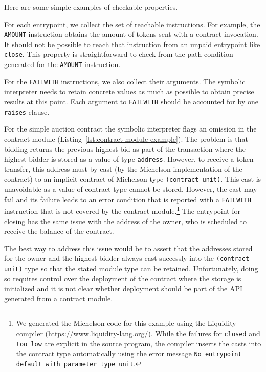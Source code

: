\documentclass[a4paper,USenglish,american,cleveref, autoref, thm-restate]{oasics-v2021}
\begin{document}
Here are some simple examples of checkable properties.

For each entrypoint, we collect the set of reachable instructions.
For example, the  \lstinline/AMOUNT/ instruction obtains the amount of
tokens sent with a contract invocation.
It should not be possible to reach that instruction from an unpaid
entrypoint  like \lstinline/close/. This property is straightforward
to check from the path condition generated for the \lstinline/AMOUNT/
instruction. 

For the \lstinline/FAILWITH/ instructions, we also collect their
arguments. The symbolic interpreter needs to retain concrete values as
much as possible to obtain precise results at this point. Each
argument to \lstinline/FAILWITH/ should be accounted for by one
\lstinline/raises/ clause.

For the simple auction contract the symbolic interpreter flags an
omission in the contract module
(Listing~\ref{lst:contract-module-example}). The problem is that
bidding returns the previous highest bid as part of the transaction
where the highest bidder is stored as a value of type
\lstinline/address/.  However, to receive a token transfer, this
address must by cast (by the Michelson implementation of the contract)
to an implicit contract of Michelson type \lstinline/(contract unit)/. This cast is unavoidable as a
value of contract type cannot be stored. However, the cast may fail and its failure leads to an
error condition that is reported with a \lstinline/FAILWITH/ instruction that is not covered by the
contract module.\footnote{We generated the Michelson code for this example using the Liquidity
  compiler (\url{https://www.liquidity-lang.org/}). While the failures for \lstinline/closed/ and
  \lstinline/too low/ are explicit in the source program, the compiler inserts the casts into the contract
  type automatically using the error message \texttt{No entrypoint default with parameter type
    unit}.}  The entrypoint for closing has the same issue with the address of the owner, who is
scheduled to receive the balance of the contract.

The best way to address this issue would be to assert that the addresses stored for the owner and
the highest bidder always cast successly into the \lstinline/(contract unit)/ type so that the
stated module type can be retained. Unfortunately, doing so requires control over the deployment of
the contract where the storage is initialized and it is not clear whether deployment should be part
of the API generated from a contract module.
\end{document}
